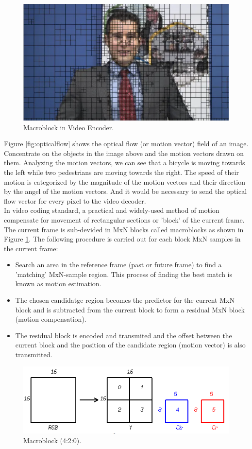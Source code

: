 \begin{figure}
\centering
 \includegraphics[width=0.8\linewidth]{Figures/macroblock.png}
 \caption{Macroblock in Video Encoder.}
 \label{fig:macroblock}
\end{figure}
Figure \ref{fig:opticalflow} shows the optical flow (or motion vector) field of an image. Concentrate on the objects in the image above and the motion vectors drawn on them. Analyzing the motion vectors, we can see that a bicycle is moving towards the left while two pedestrians are moving towards the right. The speed of their motion is categorized by the magnitude of the motion vectors and their direction by the angel of the motion vectors. And it would be necessary to send the optical flow vector for every pixel to the video decoder.\\
 In video coding standard, a practical and widely-used method of motion compensate for movement of rectangular sections or 'block' of the current frame. The current frame is sub-devided in MxN blocks called macroblocks as shown in Figure \ref{fig:macroblock}. The following procedure is carried out for each block MxN samples in the current frame:
\begin{itemize}
\item Search an area in the reference frame (past or future frame) to find a 'matching' MxN-sample region. This process of finding the best match is known as motion estimation.
\item The chosen candidatge region becomes the predictor for the current MxN block and is subtracted from the current block to form a residual MxN block (motion compensation).
\item The residual block is encoded and transmited and the offset between the current block and the position of the candidate region (motion vector) is also transmitted. 
\end{itemize}
\begin{figure}
\centering
 \includegraphics[width=0.8\linewidth]{Figures/yuv420.png}
 \caption{Macroblock (4:2:0).}
 \label{fig:yuv420}
\end{figure}
